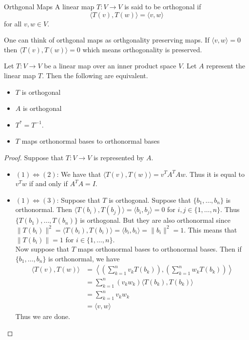\documentclass[a4paper]{article}
\begin{document}
\begin{defn}{Orthgonal Maps}{} A linear map $T:V\to V$ is said to be orthogonal if $$\langle T(v), T(w)\rangle=\langle v, w\rangle$$ for all $v,w\in V$. 
\end{defn}

One can think of orthgonal maps as orthgonality preserving maps. If $\langle v,w\rangle=0$ then $\langle T(v),T(w)\rangle=0$ which means orthogonality is preserved.

\begin{prp}{}{} Let $T:V\to V$ be a linear map over an inner product space $V$. Let $A$ represent the linear map $T$. Then the following are equivalent. 
\begin{itemize}
\item $T$ is orthogonal
\item $A$ is orthogonal
\item $T^\ast=T^{-1}$. 
\item $T$ maps orthonormal bases to orthonormal bases
\end{itemize} 
\begin{proof} Suppose that $T:V\to V$ is represented by $A$. 
\begin{itemize}
\item $(1)\iff(2)$: We have that $\langle T(v),T(w)\rangle=v^TA^TAw$. Thus it is equal to $v^Tw$ if and only if $A^TA=I$. 
\item $(1)\iff(3)$: Suppose that $T$ is orthogonal. Suppose that $\{b_1,\dots,b_n\}$ is orthonormal. Then $\langle T(b_i),T(b_j)\rangle=\langle b_i,b_j\rangle=0$ for $i,j\in\{1,\dots,n\}$. Thus $\{T(b_1),\dots,T(b_n)\}$ is orthogonal. But they are also orthonormal since $\|T(b_i)\|^2=\langle T(b_i),T(b_i)\rangle=\langle b_i,b_i\rangle=\|b_i\|^2=1$. This means that $\|T(b_i)\|=1$ for $i\in\{1,\dots,n\}$. \\
Now suppose that $T$ maps orthonormal bases to orthonormal bases. Then if $\{b_1,\dots,b_n\}$ is orthonormal, we have 
\begin{align*}
\langle T(v),T(w)\rangle&=\left\langle\left(\sum_{k=1}^nv_kT(b_k)\right),\left(\sum_{k=1}^nw_kT(b_k)\right)\right\rangle\\
&=\sum_{k=1}^n(v_kw_k)\langle T(b_k),T(b_k)\rangle\tag{$\langle T(b_i),T(b_j)\rangle=0$ if $i\neq j$}\\
&=\sum_{k=1}^nv_kw_k\\
&=\langle v,w\rangle
\end{align*}
Thus we are done. 
\end{itemize}
\end{proof}
\end{prp}
\end{document}
